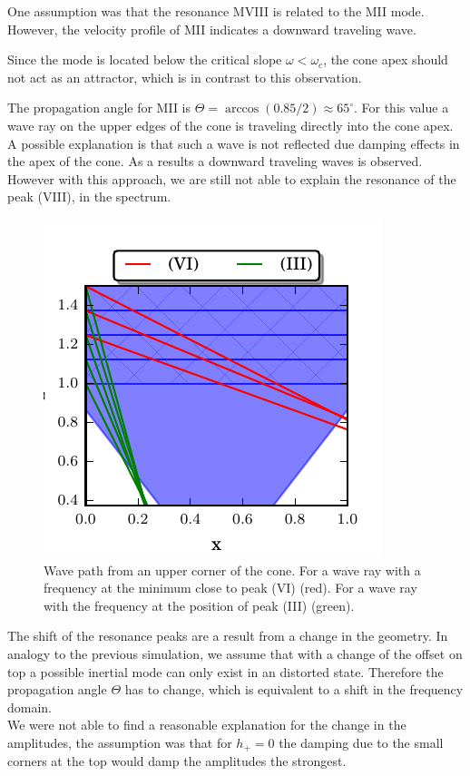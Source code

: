 One assumption was that the resonance M\RN{8} is related to the M\RN{2} mode.
However, the velocity profile of M\RN{2} indicates a downward traveling wave.

Since the mode is located below the critical slope $\omega < \omega_c$, the cone apex
should not act as an attractor, which is in contrast to this observation.

The propagation angle for M\RN{2} is $\Theta=\arccos(0.85/2)\approx65^\circ$.
For this value a wave ray on the upper edges of the cone is traveling directly
into the cone apex.
A possible explanation is that such a wave is not reflected due damping effects in
the apex of the cone. As a results a downward traveling waves is observed.
However with this approach, we are still not able to explain the resonance of the peak (\RN{8}),
in the spectrum.

\begin{figure}[!b]
  \begin{minipage}[c]{0.4\textwidth}
      \centering
      \includegraphics{gfx/cone/discussion/corners.pdf}
  \end{minipage}
  \hfill
  \begin{minipage}[c]{0.5\textwidth}
      \caption{\label{fig:conediscuss:corners}
        Wave path from an upper corner of the cone.
        For a wave ray with a frequency at the minimum close to peak (\RN{6}) (red).
        For a wave ray with the frequency at the position of peak (\RN{3}) (green).
      }
  \end{minipage}
\end{figure}

The shift of the resonance peaks are a result from a change in the geometry.
In analogy to the previous simulation, we assume that with a change of the offset on top
a possible inertial mode can only exist in an distorted state.
Therefore the propagation angle $\Theta$ has to change,
which is equivalent to a shift in the frequency domain.\\
We were not able to find a reasonable explanation for the change in the amplitudes,
the assumption was that for $h_+=0$ the damping due to the small corners at the top
would damp the amplitudes the strongest.

